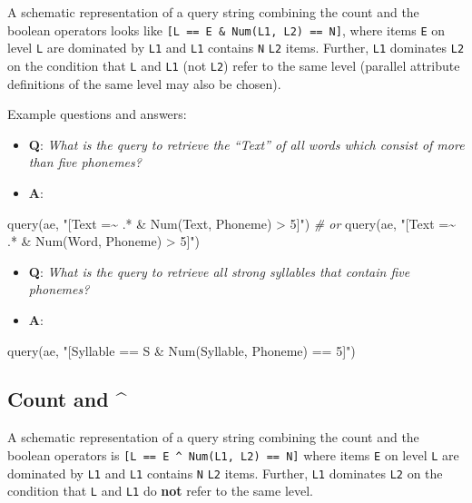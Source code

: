 \documentclass[
]{book}
\newenvironment{Shaded}{\begin{snugshade}}{\end{snugshade}}
\newcommand{\CommentTok}[1]{\textcolor[rgb]{0.56,0.35,0.01}{\textit{#1}}}
\newcommand{\FunctionTok}[1]{\textcolor[rgb]{0.00,0.00,0.00}{#1}}
\newcommand{\NormalTok}[1]{#1}
\newcommand{\StringTok}[1]{\textcolor[rgb]{0.31,0.60,0.02}{#1}}
\providecommand{\tightlist}{%
  \setlength{\itemsep}{0pt}\setlength{\parskip}{0pt}}
\begin{document}
A schematic representation of a query string combining the count and the boolean operators looks like \texttt{{[}L\ ==\ E\ \&\ Num(L1,\ L2)\ ==\ N{]}}, where items \texttt{E} on level \texttt{L} are dominated by \texttt{L1} and \texttt{L1} contains \texttt{N} \texttt{L2} items. Further, \texttt{L1} dominates \texttt{L2} on the condition that \texttt{L} and \texttt{L1} (not \texttt{L2}) refer to the same level (parallel attribute definitions of the same level may also be chosen).

Example questions and answers:

\begin{itemize}
\tightlist
\item
  \textbf{Q}: \emph{What is the query to retrieve the ``Text'' of all words which consist of more than five phonemes?}
\item
  \textbf{A}:
\end{itemize}

\begin{Shaded}
\begin{Highlighting}[]
\FunctionTok{query}\NormalTok{(ae, }\StringTok{"[Text =\textasciitilde{} .* \& Num(Text, Phoneme) \textgreater{} 5]"}\NormalTok{) }
\CommentTok{\# or }
\FunctionTok{query}\NormalTok{(ae, }\StringTok{"[Text =\textasciitilde{} .* \& Num(Word, Phoneme) \textgreater{} 5]"}\NormalTok{)}
\end{Highlighting}
\end{Shaded}

\begin{itemize}
\tightlist
\item
  \textbf{Q}: \emph{What is the query to retrieve all strong syllables that contain five phonemes?}
\item
  \textbf{A}:
\end{itemize}

\begin{Shaded}
\begin{Highlighting}[]
\FunctionTok{query}\NormalTok{(ae, }\StringTok{"[Syllable == S \& Num(Syllable, Phoneme) == 5]"}\NormalTok{)}
\end{Highlighting}
\end{Shaded}

\hypertarget{count-and}{%
\subsection{Count and \^{}}\label{count-and}}

A schematic representation of a query string combining the count and the boolean operators is \texttt{{[}L\ ==\ E\ \^{}\ Num(L1,\ L2)\ ==\ N{]}} where items \texttt{E} on level \texttt{L} are dominated by \texttt{L1} and \texttt{L1} contains \texttt{N} \texttt{L2} items. Further, \texttt{L1} dominates \texttt{L2} on the condition that \texttt{L} and \texttt{L1} do \textbf{not} refer to the same level.
\end{document}
